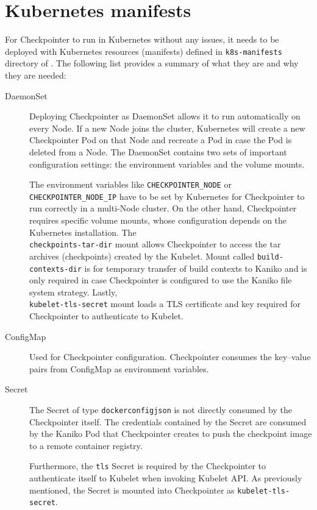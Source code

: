 \documentclass[
  digital,     %
  oneside,     %
  nosansbold,  %
  nocolorbold, %
  lof,         %
  nolot,         %
]{fithesis4}
\begin{document}
\section{Kubernetes manifests}
\label{sec:manifests}
For Checkpointer to run in Kubernetes without any issues, it needs to be deployed with Kubernetes resources (manifests) defined in \texttt{k8s-manifests} directory of . The following list provides a summary of what they are and why they are needed:

\begin{description}
    
    \item[DaemonSet] Deploying Checkpointer as DaemonSet allows it to run automatically on every Node. If a new Node joins the cluster, Kubernetes will create a new Checkpointer Pod on that Node and recreate a Pod in case the Pod is deleted from a Node. The DaemonSet contains two sets of important configuration settings: the environment variables and the volume mounts.

    The environment variables like \texttt{CHECKPOINTER\_NODE} or \\ \texttt{CHECKPOINTER\_NODE\_IP} have to be set by Kubernetes for Checkpointer to run correctly in a multi-Node cluster. On the other hand, Checkpointer requires specific volume mounts, whose configuration depends on the Kubernetes installation. The \\ \texttt{checkpoints-tar-dir} mount allows Checkpointer to access the tar archives (checkpoints) created by the Kubelet. Mount called \texttt{build-contexts-dir} is for temporary transfer of build contexts to Kaniko and is only required in case Checkpointer is configured to use the Kaniko file system strategy. Lastly, \\
    \texttt{kubelet-tls-secret} mount loads a TLS certificate and key required for Checkpointer to authenticate to Kubelet.
    
    \item[ConfigMap] Used for Checkpointer configuration. Checkpointer consumes the key--value pairs from ConfigMap as environment variables.
    
    \item[Secret] The Secret of type \texttt{dockerconfigjson} is not directly consumed by the Checkpointer itself. The credentials contained by the Secret are consumed by the Kaniko Pod that Checkpointer creates to push the checkpoint image to a remote container registry.
    
    Furthermore, the \texttt{tls} Secret is required by the Checkpointer to authenticate itself to Kubelet when invoking Kubelet API. As previously mentioned, the Secret is mounted into Checkpointer as \texttt{kubelet-tls-secret}.
    

\end{description}
\end{document}
